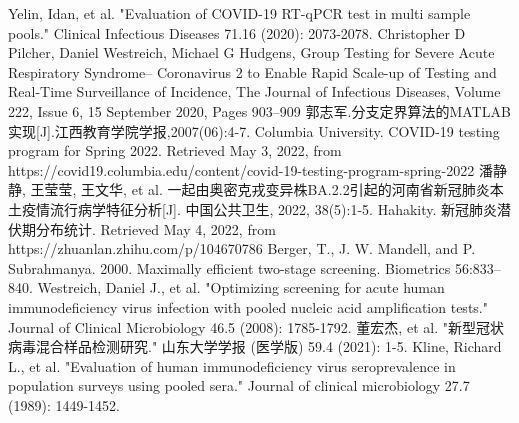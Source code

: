 \documentclass[withoutpreface,bwprint]{cumcmthesis} %
\begin{document}
\begin{thebibliography}{100}
Yelin, Idan, et al. "Evaluation of COVID-19 RT-qPCR test in multi sample pools." Clinical Infectious Diseases 71.16 (2020): 2073-2078.
Christopher D Pilcher, Daniel Westreich, Michael G Hudgens, Group Testing for Severe Acute Respiratory Syndrome– Coronavirus 2 to Enable Rapid Scale-up of Testing and Real-Time Surveillance of Incidence, The Journal of Infectious Diseases, Volume 222, Issue 6, 15 September 2020, Pages 903–909
郭志军.分支定界算法的MATLAB实现[J].江西教育学院学报,2007(06):4-7.
Columbia University. COVID-19 testing program for Spring 2022. Retrieved May 3, 2022, from https://covid19.columbia.edu/content/covid-19-testing-program-spring-2022 
潘静静, 王莹莹, 王文华, et al. 一起由奥密克戎变异株BA.2.2引起的河南省新冠肺炎本土疫情流行病学特征分析[J]. 中国公共卫生, 2022, 38(5):1-5.
Hahakity. 新冠肺炎潜伏期分布统计. Retrieved May 4, 2022, from https://zhuanlan.zhihu.com/p/104670786
Berger, T., J. W. Mandell, and P. Subrahmanya. 2000. Maximally efficient two-stage screening. Biometrics 56:833–840.
Westreich, Daniel J., et al. "Optimizing screening for acute human immunodeficiency virus infection with pooled nucleic acid amplification tests." Journal of Clinical Microbiology 46.5 (2008): 1785-1792.
董宏杰, et al. "新型冠状病毒混合样品检测研究." 山东大学学报 (医学版) 59.4 (2021): 1-5.
Kline, Richard L., et al. "Evaluation of human immunodeficiency virus seroprevalence in population surveys using pooled sera." Journal of clinical microbiology 27.7 (1989): 1449-1452.

\end{thebibliography}


\newpage
\end{document}
